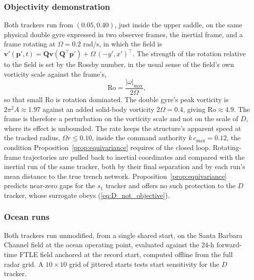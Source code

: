 \documentclass[lettersize,journal]{IEEEtran}
\begin{document}
\subsubsection{Objectivity demonstration}
Both trackers run from $(0.05, 0.40)$, just inside the upper saddle, on
the same physical double gyre expressed in two
observer frames, the inertial frame, and a frame rotating at
$\Omega = 0.2$ rad/s, in which the field is
$\mathbf{v}'(\mathbf{p}', t) = \mathbf{Q}\mathbf{v}(\mathbf{Q}^\top
\mathbf{p}') + \Omega\,(-y', x')^\top$. The strength of the rotation
relative to the field is set by the Rossby number, in the usual sense of
the field's own vorticity scale against the frame's,
\begin{equation}
    \mathrm{Ro} = \frac{\lvert\omega\rvert_{\max}}{2\Omega} ,
\end{equation}
so that small $\mathrm{Ro}$ is rotation dominated. The double gyre's peak
vorticity is $2\pi^2 A \approx 1.97$ against an added solid-body
vorticity $2\Omega = 0.4$, giving $\mathrm{Ro} \approx 4.9$. The frame is
therefore a perturbation on the vorticity scale and not on the scale of
$D$, where its effect is unbounded. The rate keeps the
structure's apparent speed at the tracked radius, $\Omega r \leq 0.10$,
inside the command authority $k\,c_{\max} = 0.12$, the condition
Proposition~\ref{prop:equivariance} requires of the closed loop.
Rotating-frame
trajectories are pulled back to inertial coordinates and compared with
the inertial run of the same tracker, both by their final separation and
by each run's mean distance to the true trench network.
Proposition~\ref{prop:equivariance} predicts near-zero gaps for the
$s_1$ tracker and offers no such protection to the $D$ tracker, whose
surrogate obeys (\ref{eq:D_not_objective}).

\subsubsection{Ocean runs}
Both trackers run unmodified, from a single shared start, on the Santa
Barbara Channel field at the ocean operating point, evaluated against the 24-h forward-time FTLE
field anchored at the record start, computed offline from the full
radar grid. A $10 \times 10$ grid
of jittered starts tests start sensitivity for the $D$ tracker.
\end{document}
